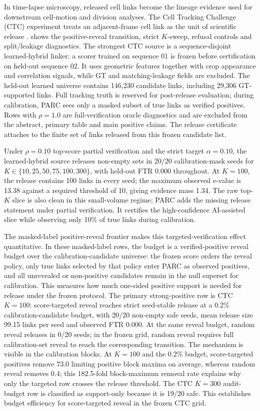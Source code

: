 \documentclass[10pt,twocolumn]{article}
\begin{document}
In time-lapse microscopy, released cell links become the lineage evidence used for downstream cell-motion and division analyses.
The Cell Tracking Challenge (CTC) experiment treats an adjacent-frame cell link as the unit of scientific release \cite{ulman2017objective,mavska2023cell}.
 shows the positive-reveal transition, strict \(K\)-sweep, refusal controls and split/leakage diagnostics.
The strongest CTC source is a sequence-disjoint learned-hybrid linker: a scorer trained on sequence 01 is frozen before certification on held-out sequence 02.
It uses geometric features together with crop appearance and correlation signals, while GT and matching-leakage fields are excluded.
The held-out learned universe contains 146,230 candidate links, including 29,306 GT-supported links.
Full tracking truth is reserved for post-release evaluation; during calibration, PARC sees only a masked subset of true links as verified positives.
Rows with \(\rho=1.0\) are full-verification oracle diagnostics and are excluded from the abstract, primary table and main positive claims.
The release certificate attaches to the finite set of links released from this frozen candidate list.

Under \(\rho=0.10\) top-score partial verification and the strict target \(\alpha=0.10\), the learned-hybrid source releases non-empty sets in 20/20 calibration-mask seeds for \(K\in\{10,25,50,75,100,300\}\), with held-out FTR 0.000 throughout.
At \(K=100\), the release contains 100 links in every seed; the maximum observed e-value is 13.38 against a required threshold of 10, giving evidence mass 1.34.
The raw top-\(K\) slice is also clean in this small-volume regime; PARC adds the missing release statement under partial verification.
It certifies the high-confidence AI-assisted slice while observing only 10\% of true links during calibration.

The masked-label positive-reveal frontier makes this targeted-verification effect quantitative.
In these masked-label rows, the budget is a verified-positive reveal budget over the calibration-candidate universe: the frozen score orders the reveal policy, only true links selected by that policy enter PARC as observed positives, and all unrevealed or non-positive candidates remain in the null superset for calibration.
This measures how much one-sided positive support is needed for release under the frozen protocol.
The primary strong-positive row is CTC \(K=100\): score-targeted reveal reaches strict seed-stable release at a 0.2\% calibration-candidate budget, with 20/20 non-empty safe seeds, mean release size 99.15 links per seed and observed FTR 0.000.
At the same reveal budget, random reveal releases in 0/20 seeds; in the frozen grid, random reveal requires full calibration-set reveal to reach the corresponding transition.
The mechanism is visible in the calibration blocks.
At \(K=100\) and the 0.2\% budget, score-targeted positives remove 73.0 limiting positive block maxima on average, whereas random reveal removes 0.4; this 182.5-fold block-maximum removal rate explains why only the targeted row crosses the release threshold.
The CTC \(K=300\) audit-budget row is classified as support-only because it is 19/20 safe.
This establishes budget efficiency for score-targeted reveal in the frozen CTC grid.
\end{document}
